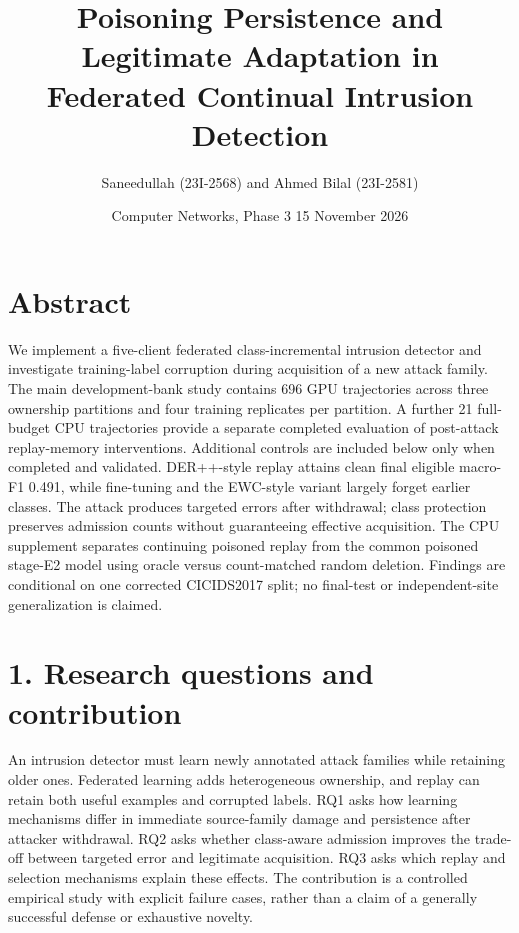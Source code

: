 \documentclass[
  10pt,
]{article}
\title{Poisoning Persistence and Legitimate Adaptation in Federated
Continual Intrusion Detection}
\author{Saneedullah (23I-2568) and Ahmed Bilal (23I-2581)}
\date{Computer Networks, Phase 3 \textbar{} 15 November 2026}
\begin{document}
\maketitle

\hypertarget{abstract}{%
\section{Abstract}\label{abstract}}

We implement a five-client federated class-incremental intrusion
detector and investigate training-label corruption during acquisition of
a new attack family. The main development-bank study contains 696 GPU
trajectories across three ownership partitions and four training
replicates per partition. A further 21 full-budget CPU trajectories
provide a separate completed evaluation of post-attack replay-memory
interventions. Additional controls are included below only when
completed and validated. DER++-style replay attains clean final eligible
macro-F1 0.491, while fine-tuning and the EWC-style variant largely
forget earlier classes. The attack produces targeted errors after
withdrawal; class protection preserves admission counts without
guaranteeing effective acquisition. The CPU supplement separates
continuing poisoned replay from the common poisoned stage-E2 model using
oracle versus count-matched random deletion. Findings are conditional on
one corrected CICIDS2017 split; no final-test or independent-site
generalization is claimed.

\hypertarget{research-questions-and-contribution}{%
\section{1. Research questions and
contribution}\label{research-questions-and-contribution}}

An intrusion detector must learn newly annotated attack families while
retaining older ones. Federated learning adds heterogeneous ownership,
and replay can retain both useful examples and corrupted labels. RQ1
asks how learning mechanisms differ in immediate source-family damage
and persistence after attacker withdrawal. RQ2 asks whether class-aware
admission improves the trade-off between targeted error and legitimate
acquisition. RQ3 asks which replay and selection mechanisms explain
these effects. The contribution is a controlled empirical study with
explicit failure cases, rather than a claim of a generally successful
defense or exhaustive novelty.
\end{document}
